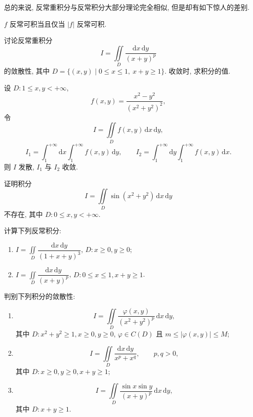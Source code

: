 \documentclass[../数学分析培优讲义.tex]{subfiles}
\begin{document}
总的来说, 反常重积分与反常积分大部分理论完全相似, 但是却有如下惊人的差别.

\begin{theorem}[\markstar]
$f$ 反常可积当且仅当 $|f|$ 反常可积.
\end{theorem}

\begin{example}
讨论反常重积分
\[
    I=\iint\limits_D\dfrac{\mathrm{d}x\,\mathrm{d}y}{(x+y)^p}
\]
的敛散性, 其中 $D=\{(x,y)\mid0\leq x\leq1,\ x+y\geq1\}$. 收敛时, 求积分的值.
\end{example}
\exampleblank

\begin{example}
设 $D:1\leq x,y<+\infty$,
\[
    f(x,y)=\dfrac{x^2-y^2}{(x^2+y^2)^2},
\]
令
\[
    I=\iint\limits_Df(x,y)\,\mathrm{d}x\,\mathrm{d}y,
\]
\[
    I_1=\int_1^{+\infty}\mathrm{d}x\int_1^{+\infty}f(x,y)\,\mathrm{d}y,
    \qquad
    I_2=\int_1^{+\infty}\mathrm{d}y\int_1^{+\infty}f(x,y)\,\mathrm{d}x.
\]
则 $I$ 发散, $I_1$ 与 $I_2$ 收敛.
\end{example}
\exampleblank

\begin{example}
证明积分
\[
    I=\iint\limits_D\sin(x^2+y^2)\,\mathrm{d}x\,\mathrm{d}y
\]
不存在, 其中 $D:0\leq x,y<+\infty$.
\end{example}
\exampleblank

\begin{example}
计算下列反常积分:
\begin{enumerate}[label=(\arabic*)]
    \item $\displaystyle I=\iint\limits_D\dfrac{\mathrm{d}x\,\mathrm{d}y}{(1+x+y)^3}$, $D:x\geq0,y\geq0$;
    \item $\displaystyle I=\iint\limits_D\dfrac{\mathrm{d}x\,\mathrm{d}y}{(x+y)^p}$, $D:0\leq x\leq1,x+y\geq1$.
\end{enumerate}
\end{example}
\exampleblank

\begin{example}
判别下列积分的敛散性:
\begin{enumerate}[label=(\arabic*)]
    \item
    \[
        I=\iint\limits_D\dfrac{\varphi(x,y)}{(x^2+y^2)^p}\,\mathrm{d}x\,\mathrm{d}y,
    \]
    其中 $D:x^2+y^2\geq1,x\geq0,y\geq0$, $\varphi\in C(D)$ 且 $m\leq|\varphi(x,y)|\leq M$;
    \item
    \[
        I=\iint\limits_D\dfrac{\mathrm{d}x\,\mathrm{d}y}{x^p+x^q},
        \qquad p,q>0,
    \]
    其中 $D:x\geq0,y\geq0,x+y\geq1$;
    \item
    \[
        I=\iint\limits_D\dfrac{\sin x\sin y}{(x+y)^p}\,\mathrm{d}x\,\mathrm{d}y,
    \]
    其中 $D:x+y\geq1$.
\end{enumerate}
\end{example}
\exampleblank
\end{document}
